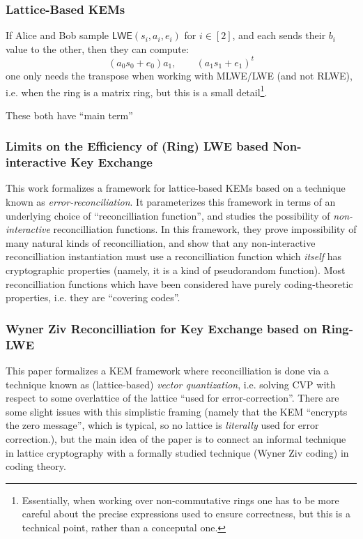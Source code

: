 \documentclass{article}
\newcommand{\LWE}{\mathsf{LWE}}
\begin{document}
\subsubsection{Lattice-Based KEMs}





If Alice and Bob sample $\LWE(s_i, a_i, e_i)$ for $i\in [2]$, and each sends their $b_i$ value to the other, then they can compute:
\begin{equation}
(a_0s_0 + e_0)a_1,\qquad (a_1s_1 + e_1)^t
\end{equation}
one only needs the transpose when working with MLWE/LWE (and not RLWE), i.e. when the ring is a matrix ring, but this is a small detail\footnote{Essentially, when working over non-commutative rings one has to be more careful about the precise expressions used to ensure correctness, but this is a technical point, rather than a conceputal one.}.

These both have ``main term''

\subsubsection{Limits on the Efficiency of (Ring) LWE based Non-interactive Key Exchange}

This work formalizes a framework for lattice-based KEMs based on a technique known as \emph{error-reconciliation}.
It parameterizes this framework in terms of an underlying choice of ``reconcilliation function'', and studies the possibility of \emph{non-interactive} reconcilliation functions.
In this framework, they prove impossibility of many natural kinds of reconcilliation, and show that any non-interactive reconcilliation instantiation must use a reconcilliation function which \emph{itself} has cryptographic properties (namely, it is a kind of pseudorandom function).
Most reconcilliation functions which have been considered have purely coding-theoretic properties, i.e. they are ``covering codes''.

\subsubsection{Wyner Ziv Reconcilliation for Key Exchange based on Ring-LWE}
This paper formalizes a KEM framework where reconcilliation is done via a technique known as (lattice-based) \emph{vector quantization}, i.e. solving CVP with respect to some overlattice of the lattice ``used for error-correction''.
There are some slight issues with this simplistic framing (namely that the KEM ``encrypts the zero message'', which is typical, so no lattice is \emph{literally} used for error correction.), but the main idea of the paper is to connect an informal technique in lattice cryptography with a formally studied technique (Wyner Ziv coding) in coding theory.
\end{document}
